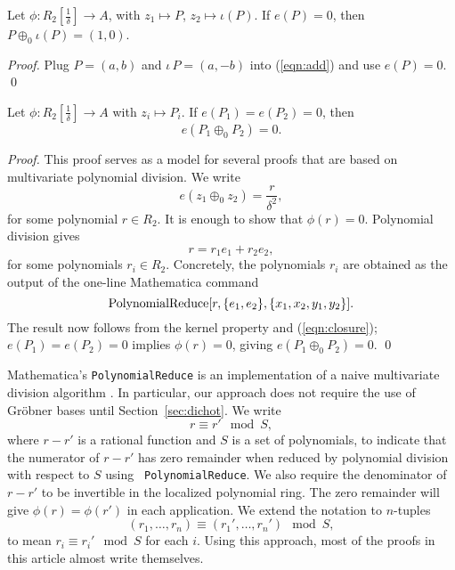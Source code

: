 \documentclass{llncs}
\newcommand{\op}[1]{\hbox{#1}}
\newcommand{\f}[1]{\frac{1}{#1}}
\begin{document}
\begin{lemma} [inverse] 
  Let $\phi:R_2[\f{\delta}]\to A$, with $z_1\mapsto P$, $z_2\mapsto
  \iota(P)$.  If $e(P)=0$, then $P\oplus_0 \iota(P) = (1,0)$.
\end{lemma}

\begin{proof} Plug $P=(a,b)$ and $\iota\,P=(a,-b)$ into
  (\ref{eqn:add}) and use $e(P)=0$.
\qed\end{proof}

\begin{lemma}\label{lemma:closure}
  Let $\phi:R_2[\f{\delta}]\to A$ with $z_i\mapsto P_i$.  If
  $e(P_1)=e(P_2)=0$, then
  \[
  e(P_1 \oplus_0 P_2) = 0.
  \]
\end{lemma}

\begin{proof} This proof serves as a model for several proofs that are
  based on multivariate polynomial division.  We write
\[
e(z_1\oplus_0 z_2) = \frac{r}{\delta^2},
\]
for some polynomial $r \in R_2$.  It is enough to show that
$\phi(r)=0$.  Polynomial division gives
\begin{equation}\label{eqn:closure}
r= r_1 e_1 + r_2 e_2,
\end{equation}
for some polynomials $r_i\in R_2$.  Concretely, the polynomials $r_i$
are obtained as the output of the one-line Mathematica command
\[
\op{PolynomialReduce}[r,\{e_1,e_2\},\{x_1,x_2,y_1,y_2\}].
\]
The result now follows from the kernel property and
(\ref{eqn:closure}); $ e(P_1) = e(P_2) = 0$ implies $\phi(r)= 0$,
giving ${e}(P_1\oplus_0 P_2)=0$.
\qed\end{proof}

Mathematica's {\tt PolynomialReduce} is an implementation of a naive
multivariate division algorithm \cite{cox1992ideals}.  In particular,
our approach does not require the use of Gr\"obner bases until
Section~\ref{sec:dichot}.  We write
\[
r \equiv r' \mod S,
\]
where $r-r'$ is a rational function and $S$ is a set of polynomials,
to indicate that the numerator of $r-r'$ has zero remainder when
reduced by polynomial division with respect to $S$ using {\tt
  PolynomialReduce}.  We also require the denominator of $r-r'$ to be
invertible in the localized polynomial ring.  The zero remainder will
give $\phi(r)=\phi(r')$ in each application.  We extend the notation
to $n$-tuples
\[
(r_1,\ldots,r_n) \equiv (r_1',\ldots,r_n') \mod S,
\]
to mean $r_i \equiv r_i' \mod S$ for each $i$.  Using this approach,
most of the proofs in this article almost write themselves.
\end{document}
